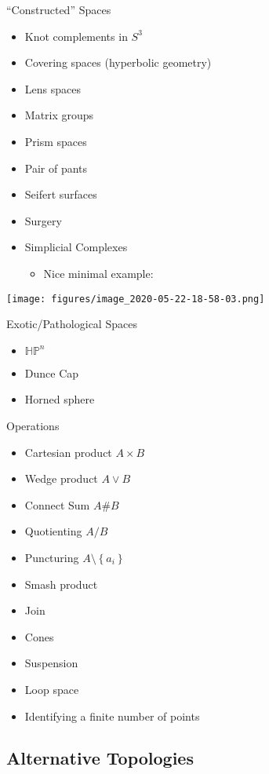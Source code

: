 ``Constructed'' Spaces

\begin{itemize}
\item
  Knot complements in \(S^3\)
\item
  Covering spaces (hyperbolic geometry)
\item
  Lens spaces
\item
  Matrix groups
\item
  Prism spaces
\item
  Pair of pants
\item
  Seifert surfaces
\item
  Surgery
\item
  Simplicial Complexes

  \begin{itemize}
  \tightlist
  \item
    Nice minimal example:
  \end{itemize}
\end{itemize}

\texttt{[image: figures/image\_2020-05-22-18-58-03.png]}

Exotic/Pathological Spaces

\begin{itemize}
\tightlist
\item
  \({\mathbb{HP}}^n\)
\item
  Dunce Cap
\item
  Horned sphere
\end{itemize}

Operations

\begin{itemize}
\tightlist
\item
  Cartesian product \(A\times B\)
\item
  Wedge product \(A \vee B\)
\item
  Connect Sum \(A \# B\)
\item
  Quotienting \(A/B\)
\item
  Puncturing \(A\setminus \left\{{a_i}\right\}\)
\item
  Smash product
\item
  Join
\item
  Cones
\item
  Suspension
\item
  Loop space
\item
  Identifying a finite number of points
\end{itemize}

\hypertarget{alternative-topologies}{%
\subsection{Alternative Topologies}\label{alternative-topologies}}

